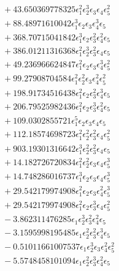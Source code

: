 \documentclass[10pt]{article}
\begin{document}
\begin{align*}
&{}  + 43.650369778325 \epsilon_{1}^{2} \epsilon_{2}^{3} \epsilon_{3} \epsilon_{4} \epsilon_{5}^{2} \\
&{}  + 88.48971610042 \epsilon_{1}^{3} \epsilon_{2} \epsilon_{3} \epsilon_{4}^{3} \epsilon_{5} \\
&{}  + 368.70715041842 \epsilon_{1}^{3} \epsilon_{2} \epsilon_{3}^{2} \epsilon_{4}^{2} \epsilon_{5} \\
&{}  + 386.01211316368 \epsilon_{1}^{2} \epsilon_{2}^{3} \epsilon_{3}^{2} \epsilon_{4} \epsilon_{5} \\
&{}  + 49.236966624847 \epsilon_{1}^{2} \epsilon_{2} \epsilon_{3} \epsilon_{4}^{3} \epsilon_{5}^{2} \\
&{}  + 99.27908704584 \epsilon_{1}^{2} \epsilon_{2}^{2} \epsilon_{3} \epsilon_{4}^{2} \epsilon_{5}^{2} \\
&{}  + 198.91734516438 \epsilon_{1}^{2} \epsilon_{2} \epsilon_{3}^{2} \epsilon_{4}^{3} \epsilon_{5} \\
&{}  + 206.79525982436 \epsilon_{1}^{2} \epsilon_{2} \epsilon_{3}^{3} \epsilon_{4}^{2} \epsilon_{5} \\
&{}  + 109.0302855721 \epsilon_{1}^{5} \epsilon_{2} \epsilon_{3} \epsilon_{4} \epsilon_{5} \\
&{}  + 112.18574698723 \epsilon_{1}^{2} \epsilon_{2}^{2} \epsilon_{3}^{2} \epsilon_{4} \epsilon_{5}^{2} \\
&{}  + 903.19301316642 \epsilon_{1}^{3} \epsilon_{2}^{2} \epsilon_{3}^{2} \epsilon_{4} \epsilon_{5} \\
&{}  + 14.182726720834 \epsilon_{1}^{2} \epsilon_{2}^{2} \epsilon_{3} \epsilon_{4} \epsilon_{5}^{3} \\
&{}  + 14.748286016737 \epsilon_{1}^{3} \epsilon_{2} \epsilon_{3} \epsilon_{4} \epsilon_{5}^{3} \\
&{}  + 29.542179974908 \epsilon_{1}^{2} \epsilon_{2} \epsilon_{3} \epsilon_{4}^{2} \epsilon_{5}^{3} \\
&{}  + 29.542179974908 \epsilon_{1}^{2} \epsilon_{2} \epsilon_{3}^{3} \epsilon_{4} \epsilon_{5}^{2} \\
&{}  - 3.862311476285 \epsilon_{1} \epsilon_{2}^{3} \epsilon_{3}^{2} \epsilon_{4}^{2} \epsilon_{5} \\
&{}  - 3.1595998195485 \epsilon_{1} \epsilon_{2}^{2} \epsilon_{3}^{2} \epsilon_{4}^{3} \epsilon_{5} \\
&{}  - 0.51011661007537 \epsilon_{1} \epsilon_{2}^{3} \epsilon_{3} \epsilon_{4}^{2} \epsilon_{5}^{2} \\
&{}  - 5.5748458101094 \epsilon_{1} \epsilon_{2}^{2} \epsilon_{3}^{3} \epsilon_{4}^{2} \epsilon_{5} \\

\end{align*}
\end{document}
